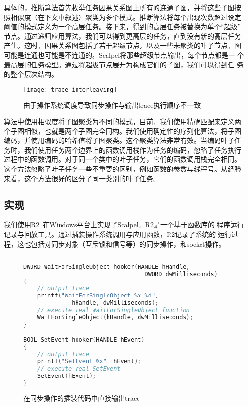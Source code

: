 具体的，推断算法首先枚举任务因果关系图上所有的连通子图，并将这些子图按
照相似度（在下文中叙述）聚类为多个模式。推断算法将每个出现次数超过设定
阈值的模式定义为一个高层任务。接下来，得到的高层任务被替换为单个“超级”
节点。通过递归应用算法，我们可以得到更高层的任务，直到没有新的高层任务
产生。这时，因果关系图包括了若干超级节点，以及一些未聚类的叶子节点，图
可能是连通也可能是不连通的。Scalpel将那些超级节点输出，每个节点都是一
个最高层的任务模型。通过将超级节点展开为构成它们的子图，我们可以得到任
务的整个层次结构。

\begin{figure}[htbp]
  \centering
  \begin{minipage}{0.8\linewidth}
    \centering
    \texttt{[image: trace\_interleaving]}
    \caption{由于操作系统调度导致同步操作与输出trace执行顺序不一致}
    \label{fig:trace_interleaving}
  \end{minipage}
\end{figure}

算法中使用相似度将子图聚类为不同的模式，目前，我们使用精确匹配来定义两
个子图相似，也就是两个子图完全同构。我们使用确定性的序列化算法，将子图
编码，并使用编码的哈希值将子图聚类。这个聚类算法非常有效。当编码叶子任
务时，我们使用任务两个边界上的函数调用栈作为任务的编码，忽略了任务执行
过程中的函数调用。对于同一个类中的叶子任务，它们的函数调用栈完全相同。
这个方法忽略了叶子任务一些不重要的区别，例如函数的参数与线程号。从经验
来看，这个方法很好的区分了同一类别的叶子任务。



\subsection{实现}

我们使用R2~\cite{r2}在Windows平台上实现了Scalpel。R2是一个基于函数库的
程序运行记录与回放工具。通过插装操作系统调用与应用函数，R2记录了系统的
运行过程，这也包括对同步对象（互斥锁和信号等）的同步操作，和socket操作。

\begin{figure}[htb]
\centering
\begin{lstlisting}[language=C++]

DWORD WaitForSingleObject_hooker(HANDLE hHandle,
                                   DWORD dwMilliseconds)
{
    // output trace
    printf("WaitForSingleObject %x %d",
              hHandle, dwMilliseconds);
    // execute real WaitForSingleObject function
    WaitForSingleObject(hHandle, dwMilliseconds);
}

BOOL SetEvent_hooker(HANDLE hEvent)
{
    // output trace
    printf("SetEvent %x", hEvent);
    // execute real SetEvent
    SetEvent(hEvent);
}
\end{lstlisting}
\caption{在同步操作的插装代码中直接输出trace}
\label{fig:trace_direct}
\end{figure}

